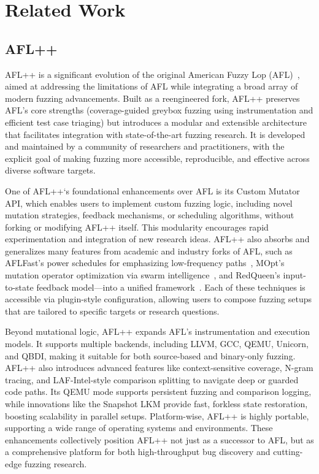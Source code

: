 \section{Related Work}

\subsection{AFL++}

AFL++ is a significant evolution of the original American Fuzzy Lop (AFL)~\cite{afl}, aimed at addressing the limitations of AFL while integrating a broad array of modern fuzzing advancements. 
Built as a reengineered fork, AFL++ preserves AFL’s core strengths (coverage-guided greybox fuzzing using instrumentation and efficient test case triaging) but introduces a modular and extensible architecture that facilitates integration with state-of-the-art fuzzing research. 
It is developed and maintained by a community of researchers and practitioners, with the explicit goal of making fuzzing more accessible, reproducible, and effective across diverse software targets.

One of AFL++‘s foundational enhancements over AFL is its Custom Mutator API, which enables users to implement custom fuzzing logic, including novel mutation strategies, feedback mechanisms, or scheduling algorithms, without forking or modifying AFL++ itself. 
This modularity encourages rapid experimentation and integration of new research ideas. 
AFL++ also absorbs and generalizes many features from academic and industry forks of AFL, such as AFLFast’s power schedules for emphasizing low-frequency paths~\cite{bohme2016aflfast}, MOpt’s mutation operator optimization via swarm intelligence~\cite{lyu2019mopt}, and RedQueen’s input-to-state feedback model—into a unified framework~\cite{aschermann2019redqueen}. 
Each of these techniques is accessible via plugin-style configuration, allowing users to compose fuzzing setups that are tailored to specific targets or research questions.

Beyond mutational logic, AFL++ expands AFL’s instrumentation and execution models. 
It supports multiple backends, including LLVM, GCC, QEMU, Unicorn, and QBDI, making it suitable for both source-based and binary-only fuzzing. 
AFL++ also introduces advanced features like context-sensitive coverage, N-gram tracing, and LAF-Intel-style comparison splitting to navigate deep or guarded code paths. 
Its QEMU mode supports persistent fuzzing and comparison logging, while innovations like the Snapshot LKM provide fast, forkless state restoration, boosting scalability in parallel setups. 
Platform-wise, AFL++ is highly portable, supporting a wide range of operating systems and environments. 
These enhancements collectively position AFL++ not just as a successor to AFL, but as a comprehensive platform for both high-throughput bug discovery and cutting-edge fuzzing research.

